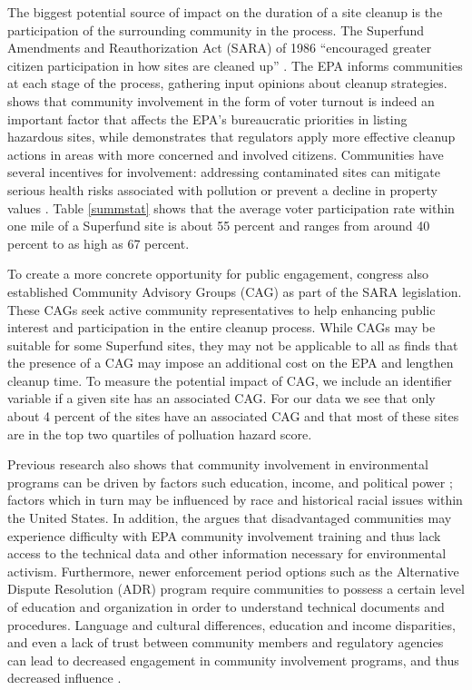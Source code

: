 \documentclass[12pt]{article}
\begin{document}
The biggest potential source of impact on the duration of a site cleanup is the participation of the surrounding community in the process. The Superfund Amendments and Reauthorization Act (SARA) of 1986 ``encouraged greater citizen participation in how sites are cleaned up'' \parencite{OLEM}. The EPA informs communities at each stage of the process,  gathering input opinions about cleanup strategies. \textcite{Sigman2001} shows that community involvement in the form of voter turnout is indeed an important factor that affects the EPA's bureaucratic priorities in listing hazardous sites, while \textcite{Viscusi1999} demonstrates that regulators apply more effective cleanup actions in areas with more concerned and involved citizens. Communities have several incentives for involvement: addressing contaminated sites can mitigate serious health risks associated with pollution or prevent a decline in property values \parencite{kohlhase1991impact}. Table \ref{summstat} shows that the average voter participation rate within one mile of a Superfund site is about 55 percent and ranges from around 40 percent to as high as 67 percent.

To create a more concrete opportunity for public engagement, congress also established Community Advisory Groups (CAG) as part of the SARA legislation. These CAGs seek active community representatives to help enhancing public interest and participation in the entire cleanup process. While CAGs may be suitable for some Superfund sites, they may not be applicable to all as \textcite{daley2004policy} finds that the presence of a CAG may impose an additional cost on the EPA and lengthen cleanup time. To measure the potential impact of CAG, we include an identifier variable if a given site has an associated CAG. For our data we see that only about 4 percent of the sites have an associated CAG and that most of these sites are in the top two quartiles of polluation hazard score. 

Previous research also shows that community involvement in environmental programs can be driven by factors such education, income, and political power \parencite{daniels2012public, OEJ2017}; factors which in turn may be influenced by race and historical racial issues within the United States. In addition, the \textcite{united2003not} argues that disadvantaged communities may experience difficulty with EPA community involvement training and thus lack access to the technical data and other information necessary for environmental activism. Furthermore, newer enforcement period options such as the Alternative Dispute Resolution (ADR) program require communities to possess a certain level of education and organization in order to understand technical documents and procedures. Language and cultural differences, education and income disparities, and even a lack of trust between community members and regulatory agencies can lead to decreased engagement in community involvement programs, and thus decreased influence \parencite{EPA2011}.
\end{document}
